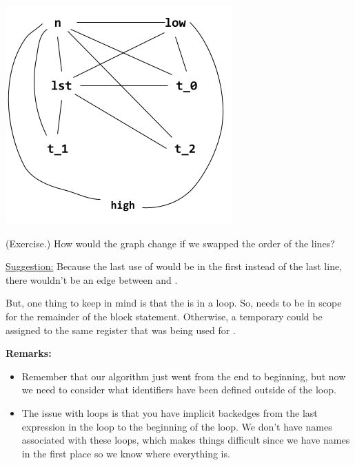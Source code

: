 \documentclass[letterpaper]{article}
\begin{document}
\begin{center}
    \includegraphics[scale=0.6]{../assets/loc_pt2.png}
\end{center}

\begin{mdframed}
    (Exercise.) How would the graph change if we swapped the order of the  lines?

    \begin{mdframed}
        \underline{Suggestion:} Because the last use of  would be in the first  instead of the last line, there wouldn't be an edge between  and . 

        \bigskip 

        But, one thing to keep in mind is that the  is in a loop. So,  needs to be in scope for the remainder of the block statement. Otherwise, a temporary could be assigned to the same register that was being used for . 
    \end{mdframed}
\end{mdframed}
\textbf{Remarks:}
\begin{itemize}
    \item Remember that our algorithm just went from the end to beginning, but now we need to consider what identifiers have been defined outside of the loop. 

    \item The issue with loops is that you have implicit backedges from the last expression in the loop to the beginning of the loop. We don't have names associated with these loops, which makes things difficult since we have names in the first place so we know where everything is. 
\end{itemize}
\end{document}
